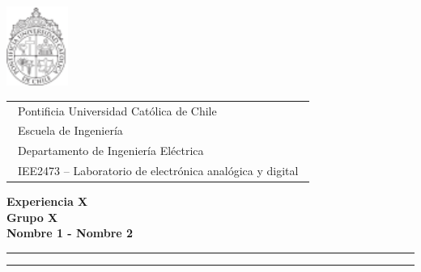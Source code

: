 \documentclass[letterpaper, 12pt]{article}
\begin{document}
\vspace*{-1cm}
\includegraphics[width=2cm]{logo.pdf}
\vspace*{-2cm}

\hspace*{2cm}
 \begin{tabular}{l}
  {\ Pontificia Universidad Católica de Chile}\\
  {\ Escuela de Ingeniería}\\
  {\ Departamento de Ingeniería Eléctrica}\\
  {\ IEE2473 – Laboratorio de electrónica analógica y digital}\
 \end{tabular}
 \hfill 
\vspace*{1mm}
\begin{center}
{\Large\bf Experiencia X}\\
\vspace*{1mm}
{\bf Grupo X}\\
{\bf Nombre 1 - Nombre 2}\\
\vspace*{1mm}
\end{center}
\hrule\vspace*{2pt}\hrule


\newpage
\printbibliography[
heading=bibintoc,
title={Bibliografía}
]

\newpage


\end{document}
